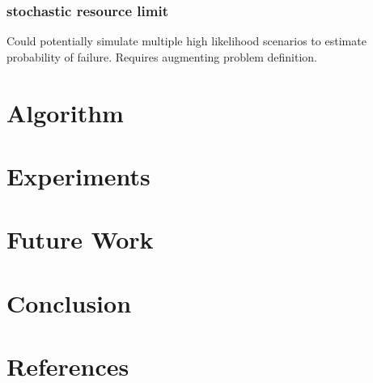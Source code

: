 \documentclass{article}
\begin{document}
\begin{multicols}{2}
\subsubsection{stochastic resource limit}
Could potentially simulate multiple high likelihood scenarios to estimate probability of failure. Requires augmenting problem definition.

\section{Algorithm}
\blindtext[5]
\section{Experiments}
\blindtext[5]
\section{Future Work}
\blindtext[5]
\section{Conclusion}
\blindtext[5]
\section{References}
\blindtext[5]


%
%
\end{multicols}
\end{document}
